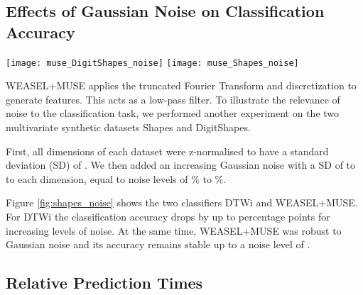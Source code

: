 \documentclass[sigconf]{acmart}
\begin{document}
\subsection{Effects of Gaussian Noise on Classification Accuracy}\label{subsec:noise}

\begin{figure*}[t]
	\begin{centering}
		\texttt{[image: muse\_DigitShapes\_noise]}
		\texttt{[image: muse\_Shapes\_noise]}
	\end{centering}
	\caption{Effects of Gaussian noise on classification accuracy. With increasing levels of noise added, the accuracy of DTW drops and remains stable for WEASEL+MUSE. \label{fig:shapes_noise}}
\end{figure*}

WEASEL+MUSE applies the truncated Fourier Transform and discretization to generate features. This acts as a low-pass filter. To illustrate the relevance of noise to the classification task, we performed another experiment on the two multivariate synthetic datasets Shapes and DigitShapes.
 
First, all dimensions of each dataset were z-normalised to have a standard deviation (SD) of . We then added an increasing Gaussian noise with a SD of  to  to each dimension, equal to noise levels of \% to \%. 

Figure \ref{fig:shapes_noise} shows the two classifiers DTWi and WEASEL+MUSE. For DTWi the classification accuracy drops by up to  percentage points for increasing levels of noise. At the same time, WEASEL+MUSE was robust to Gaussian noise and its accuracy remains stable up to a noise level of . 




\subsection{Relative Prediction Times}\label{subsec:influence}
\end{document}
